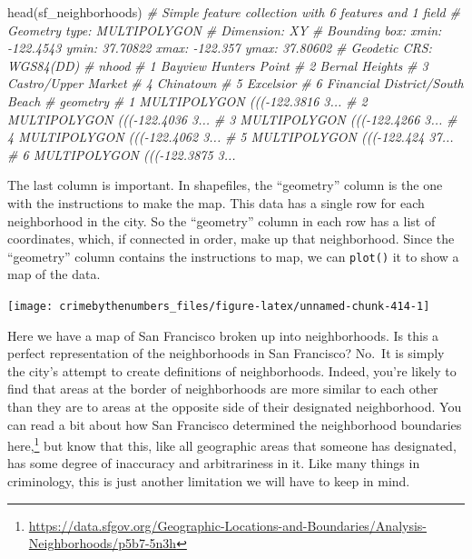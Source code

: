 \documentclass[
  a4paper,
]{krantz}
\makeatletter
\newenvironment{Shaded}{\begin{snugshade}}{\end{snugshade}}
\newcommand{\CommentTok}[1]{\textcolor[rgb]{0.37,0.37,0.37}{\textit{#1}}}
\newcommand{\FunctionTok}[1]{\textcolor[rgb]{0,0,0}{#1}}
\newcommand{\NormalTok}[1]{#1}
\newcommand{\SpecialCharTok}[1]{\textcolor[rgb]{0,0,0}{#1}}
\renewcommand{\href}[2]{#2\footnote{\url{#1}}}
\newenvironment{kframe}{%
\medskip{}
\setlength{\fboxsep}{.8em}
 \def\at@end@of@kframe{}%
 \ifinner\ifhmode%
  \def\at@end@of@kframe{\end{minipage}}%
  \begin{minipage}{\columnwidth}%
 \fi\fi%
 \def\FrameCommand##1{\hskip\@totalleftmargin \hskip-\fboxsep
 \colorbox{shadecolor}{##1}\hskip-\fboxsep
     \hskip-\linewidth \hskip-\@totalleftmargin \hskip\columnwidth}%
 \MakeFramed {\advance\hsize-\width
   \@totalleftmargin\z@ \linewidth\hsize
   \@setminipage}}%
 {\par\unskip\endMakeFramed%
 \at@end@of@kframe}
\renewenvironment{Shaded}{\begin{kframe}}{\end{kframe}}
\makeatother
\begin{document}
\begin{Shaded}
\begin{Highlighting}[]
\FunctionTok{head}\NormalTok{(sf\_neighborhoods)}
\CommentTok{\# Simple feature collection with 6 features and 1 field}
\CommentTok{\# Geometry type: MULTIPOLYGON}
\CommentTok{\# Dimension:     XY}
\CommentTok{\# Bounding box:  xmin: {-}122.4543 ymin: 37.70822 xmax: {-}122.357 ymax: 37.80602}
\CommentTok{\# Geodetic CRS:  WGS84(DD)}
\CommentTok{\#                            nhood}
\CommentTok{\# 1          Bayview Hunters Point}
\CommentTok{\# 2                 Bernal Heights}
\CommentTok{\# 3            Castro/Upper Market}
\CommentTok{\# 4                      Chinatown}
\CommentTok{\# 5                      Excelsior}
\CommentTok{\# 6 Financial District/South Beach}
\CommentTok{\#                         geometry}
\CommentTok{\# 1 MULTIPOLYGON ((({-}122.3816 3...}
\CommentTok{\# 2 MULTIPOLYGON ((({-}122.4036 3...}
\CommentTok{\# 3 MULTIPOLYGON ((({-}122.4266 3...}
\CommentTok{\# 4 MULTIPOLYGON ((({-}122.4062 3...}
\CommentTok{\# 5 MULTIPOLYGON ((({-}122.424 37...}
\CommentTok{\# 6 MULTIPOLYGON ((({-}122.3875 3...}
\end{Highlighting}
\end{Shaded}

The last column is important. In shapefiles, the
``geometry'' column is the one with the instructions to make
the map. This data has a single row for each neighborhood in
the city. So the ``geometry'' column in each row has a list
of coordinates, which, if connected in order, make up that
neighborhood. Since the ``geometry'' column contains the
instructions to map, we can \texttt{plot()} it to show a map
of the data.

\begin{Shaded}
\end{Shaded}

\begin{center}\texttt{[image: crimebythenumbers\_files/figure-latex/unnamed-chunk-414-1]} \end{center}

Here we have a map of San Francisco broken up into
neighborhoods. Is this a perfect representation of the
neighborhoods in San Francisco? No.~It is simply the city's
attempt to create definitions of neighborhoods. Indeed,
you're likely to find that areas at the border of
neighborhoods are more similar to each other than they are
to areas at the opposite side of their designated
neighborhood. You can read a bit about how San Francisco
determined the neighborhood boundaries
\href{https://data.sfgov.org/Geographic-Locations-and-Boundaries/Analysis-Neighborhoods/p5b7-5n3h}{here,}
but know that this, like all geographic areas that someone
has designated, has some degree of inaccuracy and
arbitrariness in it. Like many things in criminology, this
is just another limitation we will have to keep in mind.
\end{document}
